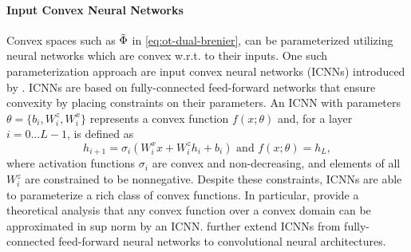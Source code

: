 \paragraph{Input Convex Neural Networks}
Convex spaces such as $\Tilde{\Phi}$ in \eqref{eq:ot-dual-brenier}, can be parameterized utilizing neural networks which are convex w.r.t. to their inputs. One such parameterization approach are input convex neural networks (ICNNs) introduced by \citet{amos2017input}.
ICNNs are based on fully-connected feed-forward networks that ensure convexity by placing constraints on their parameters.
An ICNN with parameters $\theta = \{b_i, W^z_i, W^x_i\}$ represents a convex function $f(x; \theta)$ and, for a layer $i = {0 \ldots L-1}$, is defined as
\begin{equation}
    h_{i+1} = \sigma_i(W^x_ix + W^z_i h_i + b_i)  \text { and } f(x; \theta) = h_L,
\end{equation}
where activation functions $\sigma_i$ are convex and non-decreasing, and elements of all $W^z_i$ are constrained to be nonnegative.
Despite these constraints, ICNNs are able to parameterize a rich class of convex functions.
In particular, \citet{chen2018optimal} provide a theoretical analysis that any convex function over a convex domain can be approximated in sup norm by an ICNN.
\citet{huang2021convex} further extend ICNNs from fully-connected feed-forward neural networks to convolutional neural architectures.

